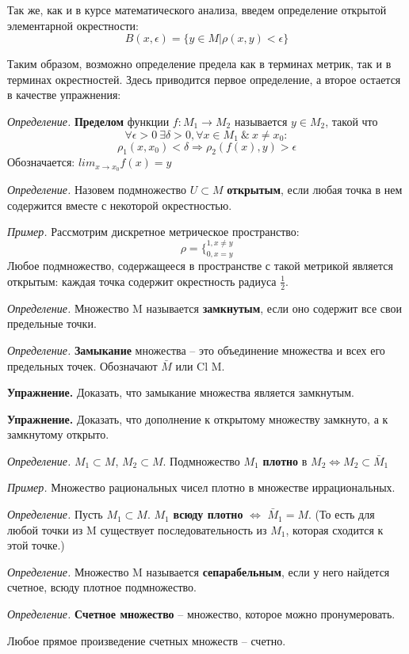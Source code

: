 \documentclass[12pt]{article}
\newcommand{\example}{{\itshape Пример. }}
\newcommand{\equals}{\Leftrightarrow}
\newcommand{\defi}{{\itshape Определение. }}
\newcommand{\exc}{{\bfseries Упражнение. }}
\begin{document}
	Так же, как и в курсе математического анализа, введем определение открытой элементарной окрестности:
	$$B(x, \epsilon) = \{y \in M | \rho(x,y) < \epsilon\}$$
	
	Таким образом, возможно определение предела как в терминах метрик, так и в терминах окрестностей. Здесь приводится первое определение,
	а второе остается в качестве упражнения:
	
	\defi \textbf{Пределом} функции $f : M_1 \rightarrow M_2$ называется $y \in M_2$, такой что $$\forall \epsilon > 0 ~\exists \delta > 0, \forall x \in M_1 ~\&~ x  \neq x_0 : $$
	$$\rho_1(x, x_0) < \delta \Rightarrow \rho_2(f(x), y) > \epsilon$$
	Обозначается: $lim_{x \rightarrow x_0} f(x) = y$
	
	\defi Назовем подмножество $U \subset M$ \textbf{открытым}, если любая точка в нем содержится вместе с некоторой окрестностью.
	
	\example Рассмотрим дискретное метрическое пространство:
	$$\rho = \{^{1, x \neq y}_{0, x = y}$$
	Любое подмножество, содержащееся в пространстве с такой метрикой является открытым: каждая точка содержит окрестность радиуса 
	$\frac{1}{2}$.
	
	\defi Множество M называется \textbf{замкнутым}, если оно содержит все свои предельные точки.
	
	\defi \textbf{Замыкание} множества -- это объединение множества и всех его предельных точек. Обозначают $\bar{M}$ или Cl M.
	
	\exc Доказать, что замыкание множества является замкнутым.
	
	\exc Доказать, что дополнение к открытому множеству замкнуто, а к замкнутому открыто.
	
	\defi $M_1 \subset M$, $M_2 \subset M$. Подмножество $M_1$ \textbf{плотно} в $M_2 \equals M_2 \subset \bar{M}_1$
	
	\example Множество рациональных чисел плотно в множестве иррациональных.
	
	\defi Пусть $M_1 \subset M$. $M_1$ \textbf{всюду плотно} $\equals$ $\bar{M}_1 = M$. (То есть для любой точки из M существует последовательность
	из $M_1$, которая сходится к этой точке.)
	
	\defi Множество M называется \textbf{сепарабельным}, если у него найдется счетное, всюду плотное подмножество.
	
	\defi \textbf{Счетное множество} -- множество, которое можно пронумеровать.

	Любое прямое произведение счетных множеств -- счетно.
	
\end{document}
